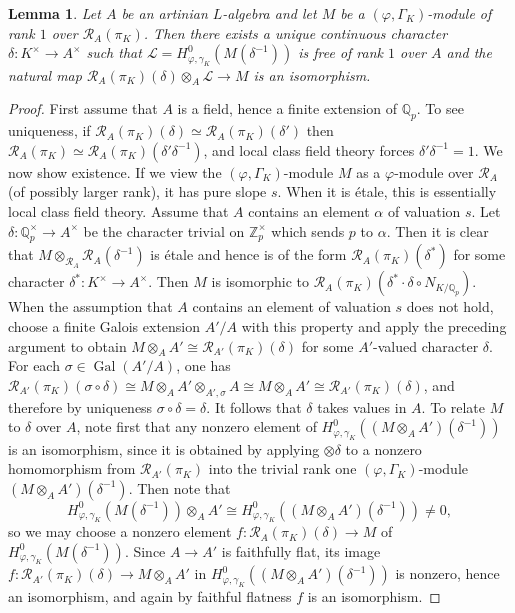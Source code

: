 \documentclass[12pt]{article}
\newtheorem{lemma}[theorem]{Lemma}
\theoremstyle{definition}
\numberwithin{equation}{theorem}
\newcommand{\calL}{\mathcal{L}}
\newcommand{\calR}{\mathcal{R}}
\newcommand{\QQ}{\mathbb{Q}}
\newcommand{\ZZ}{\mathbb{Z}}
\def\Qp{\QQ_p}
\newcommand{\Zp}{\ZZ_p}
\DeclareMathOperator{\Gal}{Gal}
\begin{document}
\begin{lemma} \label{L:artinian rank 1 classification}
Let $A$ be an artinian $L$-algebra and let 
$M$ be a $(\varphi, \Gamma_K)$-module of rank $1$ over $\calR_A(\pi_K)$.
Then there exists a unique continuous character $\delta: K^\times \to A^\times$ such that
$\calL = H^0_{\varphi, \gamma_K}(M(\delta^{-1}))$ is free of rank $1$ over $A$ and the natural map
$\calR_A(\pi_K)(\delta) \otimes_A \calL \to M$ is an isomorphism.
\end{lemma}
\begin{proof}
First assume that $A$ is a field, hence a finite extension of $\Qp$.
To see uniqueness, if $\calR_A(\pi_K)(\delta) \simeq
\calR_A(\pi_K)(\delta')$ then $\calR_A(\pi_K) \simeq
\calR_A(\pi_K)(\delta'\delta^{-1})$, and local class field theory
forces $\delta'\delta^{-1} = 1$.  We now show existence.  If we view
the $(\varphi, \Gamma_K)$-module $M$ as a $\varphi$-module over
$\calR_A$ (of possibly larger rank), it has pure slope $s$.  When it
is \'etale, this is essentially local class field theory.  Assume that
$A$ contains an element $\alpha$ of valuation $s$.  Let $\delta:
\Qp^\times \to A^\times$ be the character trivial on $\Zp^\times$
which sends $p$ to $\alpha$.  Then it is clear that $M
\otimes_{\calR_A} \calR_A(\delta^{-1})$ is \'etale and hence is of the
form $\calR_A(\pi_K)(\delta^*)$ for some character $\delta^*: K^\times
\to A^\times$.  Then $M$ is isomorphic to
$\calR_A(\pi_K)(\delta^*\cdot \delta \circ N_{K/\Qp})$.  When the
assumption that $A$ contains an element of valuation $s$ does not
hold, choose a finite Galois extension $A'/A$ with this property and
apply the preceding argument to obtain $M \otimes_A A' \cong
\calR_{A'}(\pi_K)(\delta)$ for some $A'$-valued character $\delta$.
For each $\sigma \in \Gal(A'/A)$, one has $\calR_{A'}(\pi_K)(\sigma
\circ \delta) \cong M \otimes_A A' \otimes_{A',\sigma} A \cong M
\otimes_A A' \cong \calR_{A'}(\pi_K)(\delta)$, and therefore by
uniqueness $\sigma \circ \delta = \delta$.  It follows that $\delta$
takes values in $A$.  To relate $M$ to $\delta$ over $A$, note first
that any nonzero element of $H^0_{\varphi,\gamma_K}((M \otimes_A
A')(\delta^{-1}))$ is an isomorphism, since it is obtained by applying
$\otimes \delta$ to a nonzero homomorphism from $\calR_{A'}(\pi_K)$
into the trivial rank one $(\varphi,\Gamma_K)$-module $(M \otimes_A
A')(\delta^{-1})$.  Then note that
\[
H^0_{\varphi,\gamma_K}(M(\delta^{-1})) \otimes_A A'
  \cong H^0_{\varphi,\gamma_K}((M \otimes_A A')(\delta^{-1})) \neq 0,
\]
so we may choose a nonzero element $f: \calR_A(\pi_K)(\delta) \to M$
of $H^0_{\varphi,\gamma_K}(M(\delta^{-1}))$.  Since $A \to A'$ is
faithfully flat, its image $f: \calR_{A'}(\pi_K)(\delta) \to M
\otimes_A A'$ in $H^0_{\varphi,\gamma_K}((M \otimes_A
A')(\delta^{-1}))$ is nonzero, hence an isomorphism, and again by
faithful flatness $f$ is an isomorphism.


\end{proof}
\end{document}
